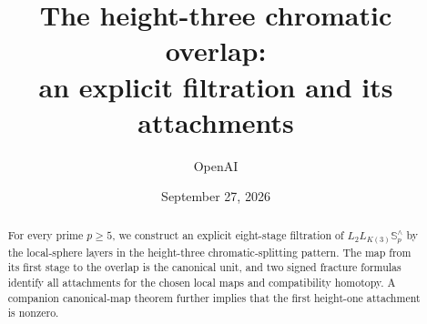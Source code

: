 \documentclass[11pt]{article}
\title{The height-three chromatic overlap:\\
an explicit filtration and its attachments}
\author{OpenAI}
\date{September 27, 2026}
\begin{document}
\maketitle
\begin{abstract}
For every prime \(p\geq5\), we construct an explicit eight-stage
filtration of \(L_2L_{K(3)}\mathbb S_p^\wedge\) by the local-sphere
layers in the height-three chromatic-splitting pattern. The map from
its first stage to the overlap is the canonical unit, and two signed
fracture formulas identify all attachments for the chosen local maps
and compatibility homotopy. A companion canonical-map theorem further
implies that the first height-one attachment is nonzero.
\end{abstract}
\tableofcontents












\appendix



\end{document}
